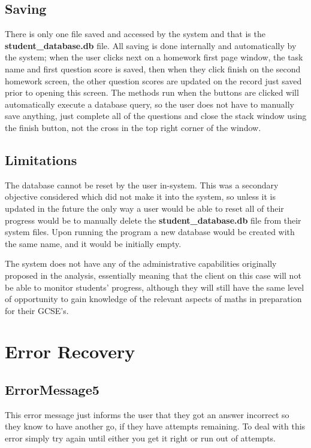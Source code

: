 \subsection{Saving}

There is only one file saved and accessed by the system and that is the \textbf{student\_database.db} file. All saving is done internally and automatically by the system; when the user clicks next on a homework first page window, the task name and first question score is saved, then when they click finish on the second homework screen, the other question scores are updated on the record just saved prior to opening this screen. The methods run when the buttons are clicked will automatically execute a database query, so the user does not have to manually save anything, just complete all of the questions and close the stack window using the finish button, not the cross in the top right corner of the window.

\subsection{Limitations}

The database cannot be reset by the user in-system. This was a secondary objective considered which did not make it into the system, so unless it is updated in the future the only way a user would be able to reset all of their progress would be to manually delete the \textbf{student\_database.db} file from their system files. Upon running the program a new database would be created with the same name, and it would be initially empty.

The system does not have any of the administrative capabilities originally proposed in the analysis, essentially meaning that the client on this case will not be able to monitor students' progress, although they will still have the same level of opportunity to gain knowledge of the relevant aspects of maths in preparation for their GCSE's.

\section{Error Recovery}

\subsection{ErrorMessage5}

This error message just informs the user that they got an answer incorrect so they know to have another go, if they have attempts remaining. To deal with this error simply try again until either you get it right or run out of attempts.

